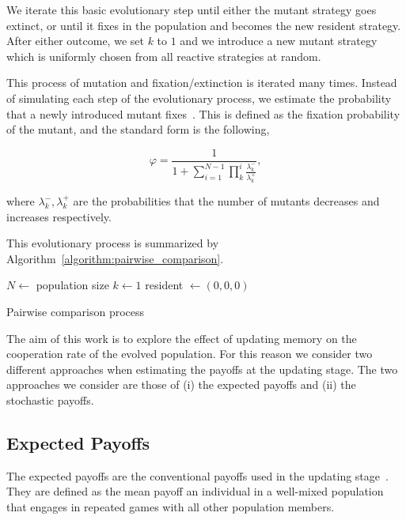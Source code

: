 \documentclass[11pt]{article}
\theoremstyle{plainCl1}
\theoremstyle{plainCl2}
\begin{document}
We iterate this basic evolutionary step until either the mutant strategy goes
extinct, or until it fixes in the population and becomes the new resident
strategy. After either outcome, we set $k$ to $1$ and we introduce a new mutant
strategy which is uniformly chosen from all reactive strategies at random.

This process of mutation and fixation/extinction is iterated many times.
Instead of simulating each step of the evolutionary process, we estimate
the probability that a newly introduced mutant fixes~\cite{nowak2004emergence}.
This is defined as the fixation probability of the mutant, and the standard
form is the following,

\begin{equation}\label{eq:appendix_fixation_probability}
\varphi = \frac{1}{1+\sum\limits_{i=1}^{N-1}\prod\limits_k^i \frac{\lambda^-_k}{\lambda^+_k}},
\end{equation}

where \(\lambda^-_k, \lambda^+_k\) are the probabilities that the number of
mutants decreases and increases respectively.

This evolutionary process is summarized by Algorithm~\ref{algorithm:pairwise_comparison}.

\begin{algorithm}[!htbp]
  \SetAlgoLined
   $N \leftarrow$ population size\;
   $k \leftarrow 1$\;
   resident $\leftarrow (0, 0, 0)$\;
     \caption{Pairwise comparison process}\label{algorithm:pairwise_comparison}
\end{algorithm}

The aim of this work is to explore the effect of updating memory on the
cooperation rate of the evolved population. For this reason we consider two
different approaches when estimating the payoffs at the updating stage. The two
approaches we consider are those of (i) the expected payoffs and (ii) the
stochastic payoffs.

\subsection*{Expected Payoffs}

The expected payoffs are the conventional payoffs used in the updating
stage~\cite{imhof2010stochastic}. They are defined as the mean payoff an
individual in a well-mixed population that engages in repeated games with all
other population members.
\end{document}
